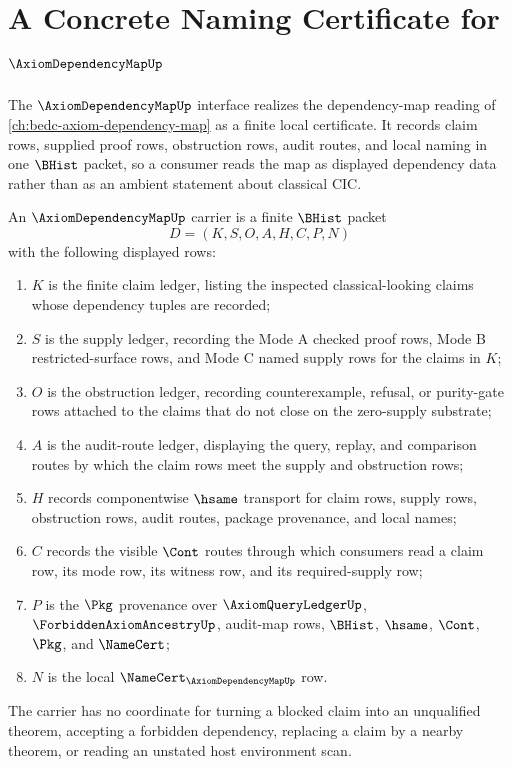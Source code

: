 \chapter{A Concrete Naming Certificate for $\AxiomDependencyMapUp$}
\label{ch:concrete-instances-axiomdependencymap-namecert}

The $\AxiomDependencyMapUp$ interface realizes the dependency-map reading of \autoref{ch:bedc-axiom-dependency-map} as a finite local certificate. It records claim rows, supplied proof rows, obstruction rows, audit routes, and local naming in one $\BHist$ packet, so a consumer reads the map as displayed dependency data rather than as an ambient statement about classical CIC.

\begin{definition}
\label{def:axiom-dependency-map-carrier}
An $\AxiomDependencyMapUp$ carrier is a finite $\BHist$ packet
$$
D=(K,S,O,A,H,C,P,N)
$$
with the following displayed rows:
\begin{enumerate}
\item $K$ is the finite claim ledger, listing the inspected classical-looking claims whose dependency tuples are recorded;
\item $S$ is the supply ledger, recording the Mode A checked proof rows, Mode B restricted-surface rows, and Mode C named supply rows for the claims in $K$;
\item $O$ is the obstruction ledger, recording counterexample, refusal, or purity-gate rows attached to the claims that do not close on the zero-supply substrate;
\item $A$ is the audit-route ledger, displaying the query, replay, and comparison routes by which the claim rows meet the supply and obstruction rows;
\item $H$ records componentwise $\hsame$ transport for claim rows, supply rows, obstruction rows, audit routes, package provenance, and local names;
\item $C$ records the visible $\Cont$ routes through which consumers read a claim row, its mode row, its witness row, and its required-supply row;
\item $P$ is the $\Pkg$ provenance over $\AxiomQueryLedgerUp$, $\ForbiddenAxiomAncestryUp$, audit-map rows, $\BHist$, $\hsame$, $\Cont$, $\Pkg$, and $\NameCert$;
\item $N$ is the local $\NameCert_{\AxiomDependencyMapUp}$ row.
\end{enumerate}
The carrier has no coordinate for turning a blocked claim into an unqualified theorem, accepting a forbidden dependency, replacing a claim by a nearby theorem, or reading an unstated host environment scan.
\end{definition}

